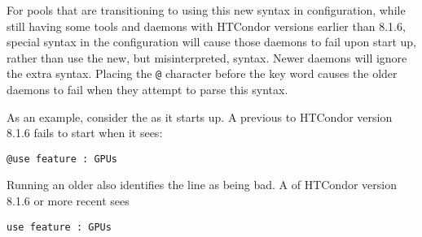 For pools that are transitioning to using this new syntax in configuration,
while still having some tools and daemons with HTCondor versions 
earlier than 8.1.6,
special syntax in the configuration will cause those daemons to
fail upon start up,
rather than use the new, but misinterpreted, syntax. 
Newer daemons will ignore the extra syntax.
Placing the \verb|@| character before the  key word
causes the older daemons to fail when they attempt to
parse this syntax.

As an example, consider the  as it starts up.
A  previous to HTCondor version 8.1.6 fails to start
when it sees:
\begin{verbatim}
@use feature : GPUs
\end{verbatim}
Running an older  also identifies the 
line as being bad.
A  of HTCondor version 8.1.6 or more recent sees
\begin{verbatim}
use feature : GPUs
\end{verbatim}

